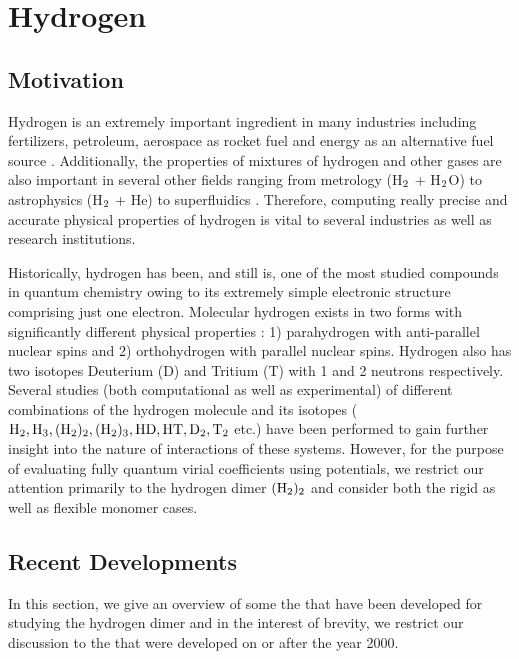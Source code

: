 \chapter{Hydrogen}
\label{chap:h2}
    \section{Motivation}
        Hydrogen is an extremely important ingredient in many industries including fertilizers, petroleum, aerospace as rocket fuel and energy as an alternative fuel source \cite{Jacobsen2007}. Additionally, the properties of mixtures of hydrogen and other gases are also important in several other fields ranging from metrology (H$_{\rm 2}$ + H$_{\rm 2}$O) \cite{Hodges2004} to astrophysics (H$_{\rm 2}$ + He) \cite{Boothroyd2002,Boothroyd2003} to superfluidics \cite{Patkowski2008,Grebenev2000}. Therefore, computing really precise and accurate physical properties of hydrogen is vital to several industries as well as research institutions.

        Historically, hydrogen has been, and still is, one of the most studied compounds in quantum chemistry owing to its extremely simple electronic structure comprising just one electron. Molecular hydrogen exists in two forms with significantly different physical properties \cite{Jacobsen2007}: 1) parahydrogen with anti-parallel nuclear spins and 2) orthohydrogen with parallel nuclear spins. Hydrogen also has two isotopes Deuterium (D) and Tritium (T) with 1 and 2 neutrons respectively. Several studies \cite{Goodwin1963,Kolos1986,Schwenke1988,Mielke2002,Manzhos2010,Garberoglio2010,Garberoglio2012,Sakoda2012,Garberoglio2013,Garberoglio2014} (both computational as well as experimental) of different combinations of the hydrogen molecule and its isotopes ($\allowbreak {\rm H_2, H_3, (H_2)_2, (H_2)_3, HD, HT, D_2, T_2}$ etc.) have been performed to gain further insight into the nature of interactions of these systems. However, for the purpose of evaluating fully quantum virial coefficients using \abinitio{} potentials, we restrict our attention primarily to the hydrogen dimer ${\rm (H_2)_2}$ and consider both the rigid as well as flexible monomer cases.

    \section{Recent Developments}
        In this section, we give an overview of some the \abinitio{} \PESs{} that have been developed for studying the hydrogen dimer and in the interest of brevity, we restrict our discussion to the \PESs{} that were developed on or after the year 2000.\\

